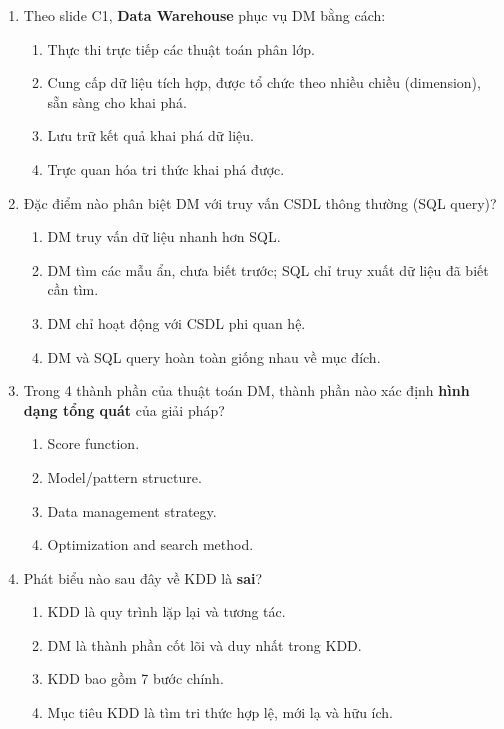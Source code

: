\documentclass[10pt]{article}
\begin{document}
\begin{enumerate}[leftmargin=*, label=\textbf{Câu \arabic*.}]
    \item Theo slide C1, \textbf{Data Warehouse} phục vụ DM bằng cách:
    \begin{enumerate}[label=\Alph*.]
        \item Thực thi trực tiếp các thuật toán phân lớp.
        \item Cung cấp dữ liệu tích hợp, được tổ chức theo nhiều chiều (dimension), sẵn sàng cho khai phá.
        \item Lưu trữ kết quả khai phá dữ liệu.
        \item Trực quan hóa tri thức khai phá được.
    \end{enumerate}

    \item Đặc điểm nào phân biệt DM với truy vấn CSDL thông thường (SQL query)?
    \begin{enumerate}[label=\Alph*.]
        \item DM truy vấn dữ liệu nhanh hơn SQL.
        \item DM tìm các mẫu ẩn, chưa biết trước; SQL chỉ truy xuất dữ liệu đã biết cần tìm.
        \item DM chỉ hoạt động với CSDL phi quan hệ.
        \item DM và SQL query hoàn toàn giống nhau về mục đích.
    \end{enumerate}

    \item Trong 4 thành phần của thuật toán DM, thành phần nào xác định \textbf{hình dạng tổng quát} của giải pháp?
    \begin{enumerate}[label=\Alph*.]
        \item Score function.
        \item Model/pattern structure.
        \item Data management strategy.
        \item Optimization and search method.
    \end{enumerate}

    \item Phát biểu nào sau đây về KDD là \textbf{sai}?
    \begin{enumerate}[label=\Alph*.]
        \item KDD là quy trình lặp lại và tương tác.
        \item DM là thành phần cốt lõi và duy nhất trong KDD.
        \item KDD bao gồm 7 bước chính.
        \item Mục tiêu KDD là tìm tri thức hợp lệ, mới lạ và hữu ích.
    \end{enumerate}

\end{enumerate}
\end{document}

